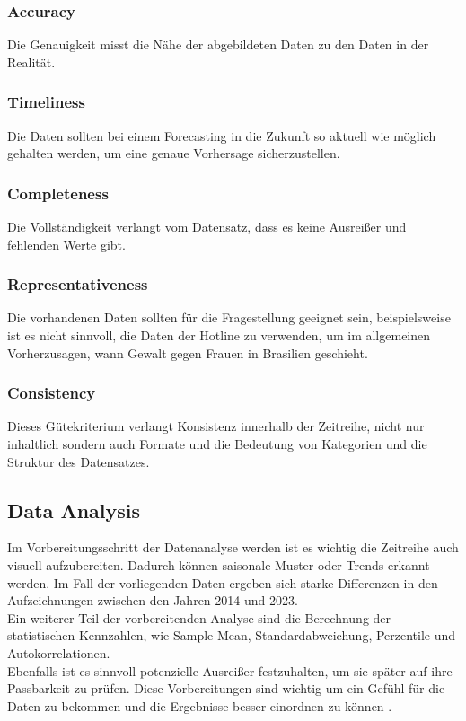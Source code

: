 \documentclass[12pt]{report}
\begin{document}
	\subsubsection{Accuracy}
	Die Genauigkeit misst die Nähe der abgebildeten Daten zu den Daten in der Realität. 
	\subsubsection{Timeliness}
	Die Daten sollten bei einem Forecasting in die Zukunft so aktuell wie möglich gehalten werden, um eine genaue Vorhersage sicherzustellen. 
	\subsubsection{Completeness}
	Die Vollständigkeit verlangt vom Datensatz, dass es keine Ausreißer und fehlenden Werte gibt. 
	\subsubsection{Representativeness}
	Die vorhandenen Daten sollten für die Fragestellung geeignet sein, beispielsweise ist es nicht sinnvoll, die Daten der Hotline zu verwenden, um im allgemeinen Vorherzusagen, wann Gewalt gegen Frauen in Brasilien geschieht.
	\subsubsection{Consistency}
	Dieses Gütekriterium verlangt Konsistenz innerhalb der Zeitreihe, nicht nur inhaltlich sondern auch Formate und die Bedeutung von Kategorien und die Struktur des Datensatzes.
	
	\subsection{Data Analysis}
	Im Vorbereitungsschritt der Datenanalyse werden ist es wichtig die Zeitreihe auch visuell aufzubereiten. Dadurch können saisonale Muster oder Trends erkannt werden\cite[14f.]{Montgomery.2015}. 
	Im Fall der vorliegenden Daten ergeben  sich starke Differenzen in den Aufzeichnungen zwischen den Jahren 2014 und 2023.\\
	Ein weiterer Teil der vorbereitenden Analyse sind die Berechnung der statistischen Kennzahlen, wie Sample Mean, Standardabweichung, Perzentile und Autokorrelationen.\\ %
	Ebenfalls ist es sinnvoll potenzielle Ausreißer festzuhalten, um sie später auf ihre Passbarkeit zu prüfen. Diese Vorbereitungen sind wichtig um ein Gefühl für die Daten zu bekommen und die Ergebnisse besser einordnen zu können \cite[15]{Montgomery.2015}.\\
\end{document}
